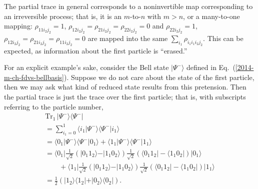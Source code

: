 The partial trace in general corresponds to a noninvertible map corresponding to an irreversible process; that is,
it is an $m$-to-$n$ with $m>n$, or a many-to-one mapping:
$\rho_{1 1 i_2 j_2} = 1$, $\rho_{1 2 i_2 j_2} =   \rho_{2 1 i_2 j_2} =  \rho_{2 2 i_2 j_2} = 0$
and
$\rho_{2 2 i_2 j_2} = 1$, $\rho_{1 2 i_2 j_2} =   \rho_{2 1 i_2 j_2} =  \rho_{1 1 i_2 j_2} = 0$
are mapped into the same  $ \sum_{i_1} \rho_{i_1 i_1 i_2 j_2}$.
This can be expected, as information about the first particle is ``erased.''



{\color{blue}
\bexample




\label{bellstate}
For an explicit example's sake, consider the Bell state         $\vert \Psi^- \rangle$
defined in Eq.~(\ref{2014-m-ch-fdvs-bellbasis}).
Suppose we do not care about the state of the first particle, then we may ask what kind of reduced state results from this
pretension.
Then the partial trace is just the trace over the first particle; that is, with subscripts referring to the particle number,
\begin{equation}
\begin{split}
\textrm{Tr}_1\, \vert \Psi^- \rangle \langle  \Psi^-   \vert  \\
=\sum_{i_1=0}^1 \langle i_1 \vert \Psi^- \rangle \langle  \Psi^-  \vert i_1 \rangle \\
=\langle 0_1 \vert \Psi^- \rangle \langle  \Psi^-  \vert 0_1 \rangle
+
\langle 1_1  \vert \Psi^- \rangle \langle  \Psi^-  \vert 1_1 \rangle  \\
=\langle 0_1 \vert  \frac{1}{\sqrt{2}}\left(\vert 0_1   1_2 \rangle - \vert 1_1   0_2 \rangle  \right)  \frac{1}{\sqrt{2}}\left(\langle 0_1   1_2 \vert  - \langle 1_1   0_2 \vert   \right)  \vert 0_1 \rangle\\
\qquad
+
\langle 1_1 \vert  \frac{1}{\sqrt{2}}\left(\vert 0_1   1_2 \rangle - \vert 1_1   0_2 \rangle  \right)  \frac{1}{\sqrt{2}}\left(\langle 0_1   1_2 \vert  - \langle 1_1   0_2 \vert   \right)  \vert 1_1 \rangle  \\
= \frac{1}{2}
\left(
\vert 1_2 \rangle \langle   1_2 \vert
+
\vert 0_2 \rangle \langle   0_2 \vert
\right)
.
\end{split}
\end{equation}

}

